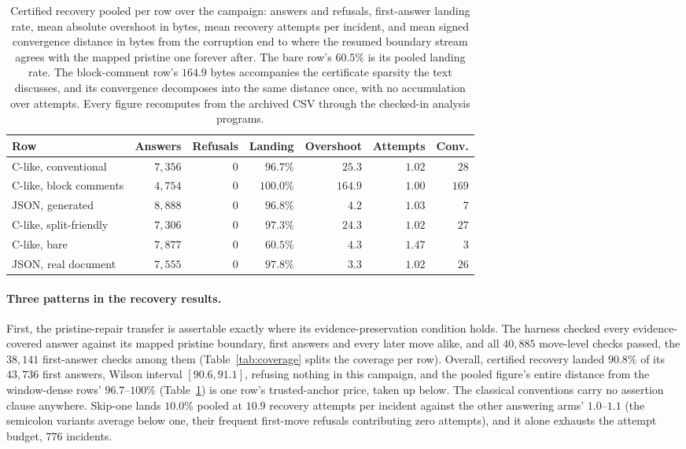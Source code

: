 \documentclass[11pt,a4paper]{article}
\theoremstyle{definition}
\theoremstyle{plain}
\theoremstyle{remark}
\begin{document}
\begin{table}[tbp]
\centering
\small
\setlength{\tabcolsep}{5pt}
\renewcommand{\arraystretch}{1.15}
\begin{tabular}{lrrrrrr}
\toprule
Row & Answers & Refusals & Landing & Overshoot & Attempts & Conv. \\
\midrule
C-like, conventional & $7{,}356$ & $0$ & $96.7\%$ & $25.3$ & $1.02$ & $28$ \\
C-like, block comments & $4{,}754$ & $0$ & $100.0\%$ & $164.9$ & $1.00$ & $169$ \\
JSON, generated & $8{,}888$ & $0$ & $96.8\%$ & $4.2$ & $1.03$ & $7$ \\
C-like, split-friendly & $7{,}306$ & $0$ & $97.3\%$ & $24.3$ & $1.02$ & $27$ \\
C-like, bare & $7{,}877$ & $0$ & $60.5\%$ & $4.3$ & $1.47$ & $3$ \\
JSON, real document & $7{,}555$ & $0$ & $97.8\%$ & $3.3$ & $1.02$ & $26$ \\
\bottomrule
\end{tabular}
\renewcommand{\arraystretch}{1.0}
\caption{Certified recovery pooled per row over the campaign: answers and refusals,
first-answer landing rate, mean absolute overshoot in bytes, mean recovery attempts per incident, and mean signed
convergence distance in bytes from the corruption end to where the resumed boundary stream agrees with the mapped
pristine one forever after. The bare row's $60.5\%$ is its pooled landing rate. The block-comment row's $164.9$ bytes
accompanies the certificate sparsity the text discusses, and its convergence decomposes into the same distance once,
with no accumulation over attempts. Every figure recomputes from the archived CSV through the checked-in analysis
programs.}
\label{tab:pooled}
\end{table}


\paragraph{Three patterns in the recovery results.} First, the pristine-repair transfer is assertable exactly where its
evidence-preservation condition holds. The harness checked every evidence-covered answer against its mapped pristine
boundary, first answers and every later move alike, and all $40{,}885$ move-level checks passed, the $38{,}141$
first-answer checks among them (Table~\ref{tab:coverage} splits the coverage per row). Overall, certified recovery
landed $90.8$\% of its $43{,}736$ first answers, Wilson interval $[90.6, 91.1]$, refusing nothing in this campaign, and
the pooled figure's entire distance from the window-dense rows' $96.7$--$100$\% (Table~\ref{tab:pooled}) is one row's
trusted-anchor price, taken up below. The classical conventions carry no assertion clause anywhere. Skip-one lands
$10.0$\% pooled at $10.9$ recovery attempts per incident against the other answering arms' $1.0$--$1.1$ (the semicolon
variants average below one, their frequent first-move refusals contributing zero attempts), and it alone exhausts the
attempt budget, $776$ incidents.
\end{document}
